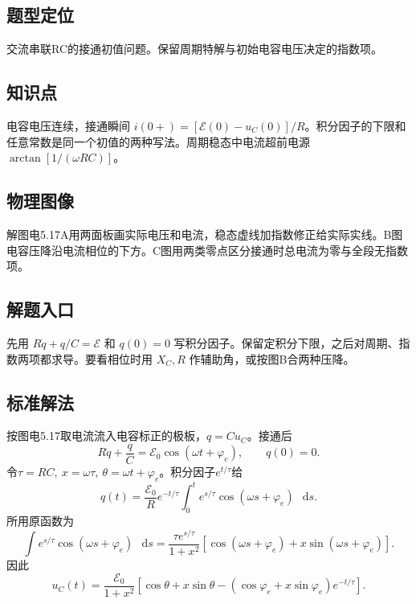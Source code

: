 \documentclass[UTF8,fontset=fandol,a4paper,11pt]{ctexart}
\newcommand{\dd}{\mathop{}\!\mathrm{d}}
\begin{document}


\subsection*{题型定位}

交流串联RC的接通初值问题。保留周期特解与初始电容电压决定的指数项。



\subsection*{知识点}

电容电压连续，接通瞬间 $i(0+)=[\mathcal E(0)-u_C(0)]/R$。积分因子的下限和任意常数是同一个初值的两种写法。周期稳态中电流超前电源 $\arctan[1/(\omega RC)]$。



\subsection*{物理图像}

解图电5.17A用两面板画实际电压和电流，稳态虚线加指数修正给实际实线。B图电容压降沿电流相位的下方。C图用两类零点区分接通时总电流为零与全段无指数项。



\subsection*{解题入口}

先用 $R\dot q+q/C=\mathcal E$ 和 $q(0)=0$ 写积分因子。保留定积分下限，之后对周期、指数两项都求导。要看相位时用 $X_C,R$ 作辅助角，或按图B合两种压降。


\subsection*{标准解法}


按图电5.17取电流流入电容标正的极板，$q=Cu_C$。接通后
\[
 R\dot q+\frac qC=\mathcal E_0\cos(\omega t+\varphi_e),
 \qquad q(0)=0.
\]
令$\tau=RC,\ x=\omega\tau,\ \theta=\omega t+\varphi_e$。积分因子$e^{t/\tau}$给
\[
 q(t)=\frac{\mathcal E_0}{R}e^{-t/\tau}
 \int_0^t e^{s/\tau}\cos(\omega s+\varphi_e)\,\dd s .
\]
所用原函数为
\[
 \int e^{s/\tau}\cos(\omega s+\varphi_e)\,\dd s
 =\frac{\tau e^{s/\tau}}{1+x^2}
 [\cos(\omega s+\varphi_e)+x\sin(\omega s+\varphi_e)].
\]
因此
\[
 u_C(t)=\frac{\mathcal E_0}{1+x^2}
 [\cos\theta+x\sin\theta
 -(\cos\varphi_e+x\sin\varphi_e)e^{-t/\tau}].
\]
\end{document}
